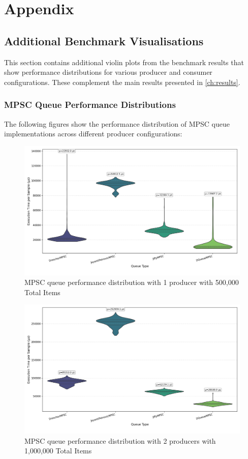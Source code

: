 \chapter{Appendix}

\section{Additional Benchmark Visualisations}
This section contains additional violin plots from the benchmark results that show performance distributions for various producer and consumer configurations. These complement the main results presented in \cref{ch:results}.

\subsection{MPSC Queue Performance Distributions}\label{subsec:mpsc-violin}
The following figures show the performance distribution of MPSC queue implementations across different producer configurations:

\begin{figure}[H]
\centering
\caption{MPSC queue performance distribution with 1 producer with 500,000 Total Items}
\label{fig:mpsc-violin-1p}
\includegraphics[width=\textwidth]{images/results/mpsc_performance_violin_1_producers.png}
\end{figure}

\begin{figure}[H]
\centering
\caption{MPSC queue performance distribution with 2 producers with 1,000,000 Total Items}
\label{fig:mpsc-violin-2p}
\includegraphics[width=\textwidth]{images/results/mpsc_performance_violin_2_producers.png}
\end{figure}

